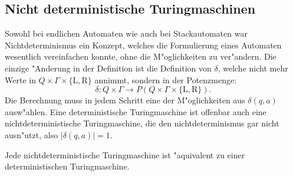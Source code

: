 \subsection{Nicht deterministische Turingmaschinen}
Sowohl bei endlichen Automaten wie auch bei Stackautomaten war
Nichtdeterminismus ein Konzept, welches die Formulierung eines
Automaten wesentlich vereinfachen konnte, ohne die M"oglichkeiten
zu ver"andern. Die einzige "Anderung in der Definition ist die
Definition von $\delta$, welche nicht mehr Werte in
$Q\times \Gamma\times\{\text{L},\text{R}\}$ annimmt, sondern
in der Potenzmenge:
\[
\delta\colon Q\times\Gamma\to
P(Q\times \Gamma\times\{\text{L},\text{R}\}).
\]
Die Berechnung muss in jedem Schritt eine der M"oglichkeiten
aus $\delta(q,a)$ ausw"ahlen.
Eine deterministische Turingmaschine ist offenbar auch eine
nichtdeterministische Turingmaschine, die den nichtdeterminismus
gar nicht ausn"utzt, also $|\delta(q,a)|=1$.

\begin{satz}
\label{nichtdeterministischeturingmaschine}
Jede nichtdeterministische Turingmaschine ist "aquivalent zu einer
deterministischen Turingmaschine.
\end{satz}


